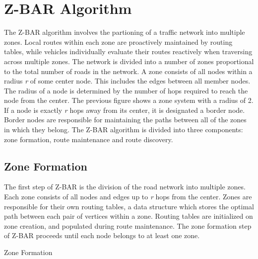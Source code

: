 \documentclass[conference]{IEEEtran}
\begin{document}
\section{Z-BAR Algorithm} %

The Z-BAR algorithm involves the partioning of a traffic network into multiple zones. Local routes within each zone are proactively maintained by routing tables, while vehicles individually evaluate their routes reactively when traversing across multiple zones. The network is divided into a number of zones proportional to the total number of roads in the network. A zone consists of all nodes within a radius \textit{r} of some center node. This includes the edges between all member nodes. The radius of a node is determined by the number of hops required to reach the node from the center. The previous figure shows a zone system with a radius of 2. If a node is exactly \textit{r} hops away from its center, it is designated a border node. Border nodes are responsible for maintaining the paths between all of the zones in which they belong. The Z-BAR algorithm is divided into three components: zone formation, route maintenance and route discovery.

\subsection{Zone Formation}

The first step of Z-BAR is the division of the road network into multiple zones. Each zone consists of all nodes and edges up to \textit{r} hops from the center. Zones are responsible for their own routing tables, a data structure which stores the optimal path between each pair of vertices within a zone. Routing tables are initialized on zone creation, and populated during route maintenance. The zone formation step of Z-BAR proceeds until each node belongs to at least one zone.

\begin{algorithm}[H]
  \caption{Zone Formation}
  \label{zone_formation}
  \begin{algorithmic}[1] %
    \EndIf
  \EndFor
  \EndProcedure
  \end{algorithmic}
\end{algorithm}
\end{document}
